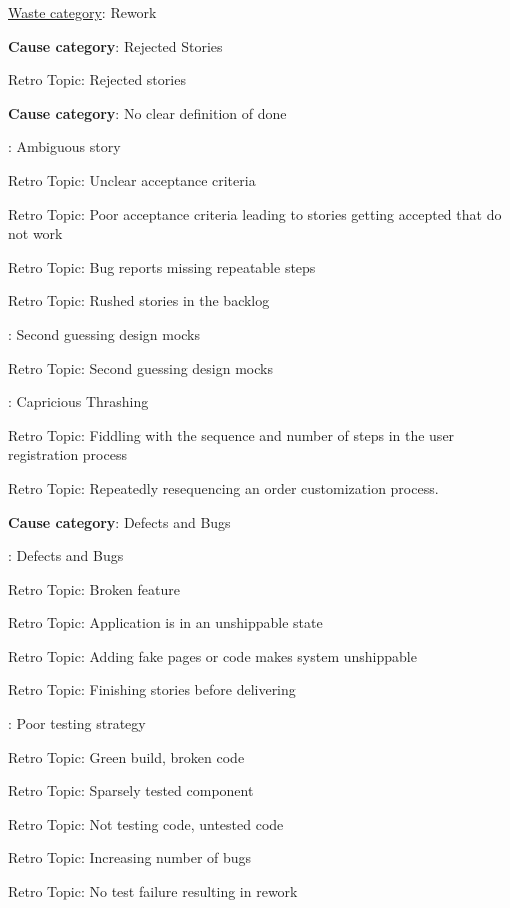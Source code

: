 \underline{Waste category}: Rework

\quad \textbf{Cause category}: Rejected Stories

\quad \quad Retro Topic: Rejected stories

\quad \textbf{Cause category}: No clear definition of done

\quad {}: Ambiguous story

\quad \quad \quad Retro Topic: Unclear acceptance criteria

\quad \quad \quad Retro Topic: Poor acceptance criteria leading to stories getting accepted that do not work

\quad \quad \quad Retro Topic: Bug reports missing repeatable steps

\quad \quad \quad Retro Topic: Rushed stories in the backlog

\quad {}: Second guessing design mocks

\quad \quad \quad Retro Topic: Second guessing design mocks

\quad {}: Capricious Thrashing

\quad \quad \quad Retro Topic: Fiddling with the sequence and number of steps in the user registration process

\quad \quad \quad Retro Topic: Repeatedly resequencing an order customization process.

\quad \textbf{Cause category}: Defects and Bugs

\quad {}: Defects and Bugs

\quad \quad \quad Retro Topic: Broken feature

\quad \quad \quad Retro Topic: Application is in an unshippable state

\quad \quad \quad Retro Topic: Adding fake pages or code makes system unshippable

\quad \quad \quad Retro Topic: Finishing stories before delivering

\quad {}: Poor testing strategy

\quad \quad \quad Retro Topic: Green build, broken code

\quad \quad \quad Retro Topic: Sparsely tested component

\quad \quad \quad Retro Topic: Not testing code, untested code

\quad \quad \quad Retro Topic: Increasing number of bugs

\quad \quad \quad Retro Topic: No test failure resulting in rework

